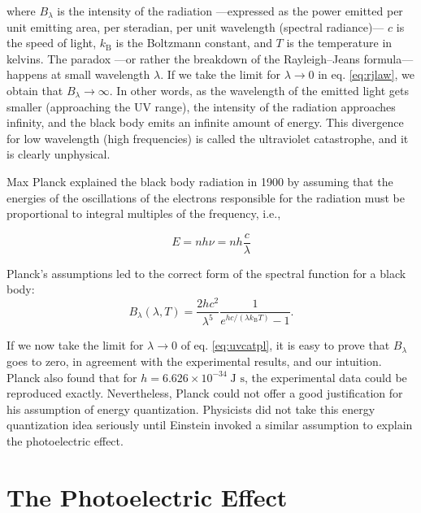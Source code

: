\documentclass[
  9pt,
]{extbook}
\theoremstyle{definition}
\theoremstyle{definition}
\theoremstyle{definition}
\theoremstyle{remark}
\begin{document}
where \(B_{\lambda }\) is the intensity of the radiation ---expressed as the power emitted per unit emitting area, per steradian, per unit wavelength (spectral radiance)---
\(c\) is the speed of light, \(k_{\mathrm{B}}\) is the Boltzmann constant, and \(T\) is the temperature in kelvins.
The paradox ---or rather the breakdown of the Rayleigh--Jeans formula--- happens at small wavelength \(\lambda\). If we take the limit for \(\lambda \rightarrow 0\) in eq. \eqref{eq:rjlaw}, we obtain that \(B_{\lambda } \rightarrow \infty\). In other words, as the wavelength of the emitted light gets smaller (approaching the UV range), the intensity of the radiation approaches infinity, and the black body emits an infinite amount of energy. This divergence for low wavelength (high frequencies) is called the ultraviolet catastrophe, and it is clearly unphysical.

Max Planck explained the black body radiation in 1900 by assuming that the energies of the oscillations of the electrons responsible for the radiation must be proportional to integral multiples of the frequency, i.e.,

\begin{equation}
E = n h \nu = n h \frac{c}{\lambda}
\label{eq:uvcat}
\end{equation}

Planck's assumptions led to the correct form of the spectral function for a black body:
\begin{equation}
B_{\lambda }(\lambda ,T)={\frac {2hc^{2}}{\lambda ^{5}}}{\frac {1}{e^{hc/(\lambda k_{\mathrm {B} }T)}-1}}.
\label{eq:uvcatpl}
\end{equation}

If we now take the limit for \(\lambda \rightarrow 0\) of eq. \eqref{eq:uvcatpl}, it is easy to prove that \(B_{\lambda }\) goes to zero, in agreement with the experimental results, and our intuition. Planck also found that for \(h = 6.626 \times 10^{-34} \; \text{J s}\), the experimental data could be reproduced exactly. Nevertheless, Planck could not offer a good justification for his assumption of energy quantization. Physicists did not take this energy quantization idea seriously until Einstein invoked a similar assumption to explain the photoelectric effect.

\hypertarget{the-photoelectric-effect}{%
\section{The Photoelectric Effect}\label{the-photoelectric-effect}}
\end{document}
